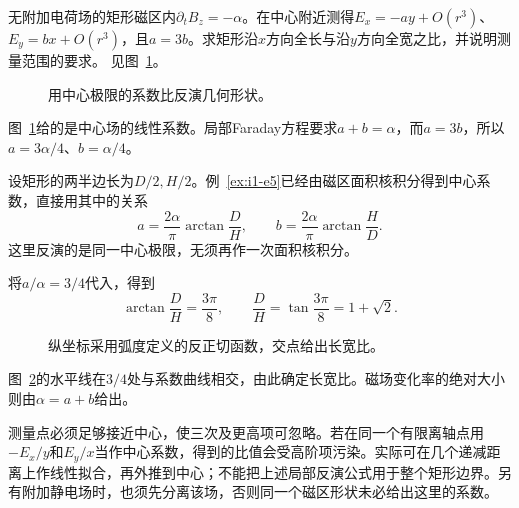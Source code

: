\begin{exercise}[由中心电场反求磁区长宽比]\label{ex:i1-h7}
无附加电荷场的矩形磁区内$\partial_tB_z=-\alpha$。在中心附近测得$E_x=-ay+O(r^3)$、$E_y=bx+O(r^3)$，且$a=3b$。求矩形沿$x$方向全长与沿$y$方向全宽之比，并说明测量范围的要求。 见图~\ref{fig:i1-h7-q}。
\end{exercise}

\begin{figure}[H]\centering
{}
\caption{用中心极限的系数比反演几何形状。}\label{fig:i1-h7-q}
\end{figure}
\begin{solution}
图~\ref{fig:i1-h7-q}给的是中心场的线性系数。局部Faraday方程要求$a+b=\alpha$，而$a=3b$，所以$a=3\alpha/4$、$b=\alpha/4$。

设矩形的两半边长为$D/2,H/2$。例~\ref{ex:i1-e5}已经由磁区面积核积分得到中心系数，直接用其中的关系
\[a=\frac{2\alpha}{\pi}\arctan\frac DH,\qquad
b=\frac{2\alpha}{\pi}\arctan\frac HD.\]
这里反演的是同一中心极限，无须再作一次面积核积分。

将$a/\alpha=3/4$代入，得到
\[\arctan\frac DH=\frac{3\pi}{8},\qquad
\boxed{\frac DH=\tan\frac{3\pi}{8}=1+\sqrt2}.
\]

\begin{figure}[H]\centering
{}
\caption{纵坐标采用弧度定义的反正切函数，交点给出长宽比。}\label{fig:i1-h7-s}
\end{figure}

图~\ref{fig:i1-h7-s}的水平线在$3/4$处与系数曲线相交，由此确定长宽比。磁场变化率的绝对大小则由$\alpha=a+b$给出。

测量点必须足够接近中心，使三次及更高项可忽略。若在同一个有限离轴点用$-E_x/y$和$E_y/x$当作中心系数，得到的比值会受高阶项污染。实际可在几个递减距离上作线性拟合，再外推到中心；不能把上述局部反演公式用于整个矩形边界。另有附加静电场时，也须先分离该场，否则同一个磁区形状未必给出这里的系数。
\end{solution}

